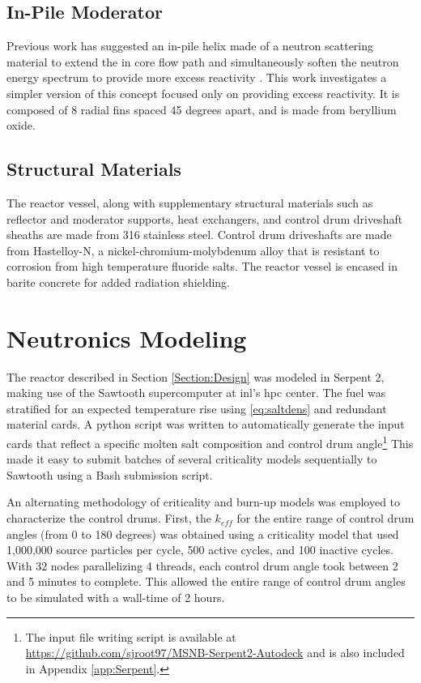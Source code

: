 \subsection{In-Pile Moderator}
Previous work has suggested an in-pile helix made of a neutron scattering material to extend the in core flow path and simultaneously soften the neutron energy spectrum to provide more excess reactivity \cite{CarterPHD}. This work investigates a simpler version of this concept focused only on providing excess reactivity. It is composed of 8 radial fins spaced 45 degrees apart, and is made from beryllium oxide.

\subsection{Structural Materials}
The reactor vessel, along with supplementary structural materials such as reflector and moderator supports, heat exchangers, and control drum driveshaft sheaths are made from 316 stainless steel. Control drum driveshafts are made from Hastelloy-N, a nickel-chromium-molybdenum alloy that is resistant to corrosion from high temperature fluoride salts. The reactor vessel is encased in barite concrete for added radiation shielding.

\section{Neutronics Modeling}\label{Section:Serpent}
The reactor described in Section \ref{Section:Design} was modeled in Serpent 2, making use of the Sawtooth supercomputer at \acs{inl}'s \acs{hpc} center. The fuel was stratified for an expected temperature rise using \ref{eq:saltdens} and redundant material cards. A python script was written to automatically generate the input cards that reflect a specific molten salt composition and control drum angle\footnote{The input file writing script is available at \href{https://github.com/sjroot97/MSNB-Serpent2-Autodeck}{https://github.com/sjroot97/MSNB-Serpent2-Autodeck} and is also included in Appendix \ref{app:Serpent}.} This made it easy to submit batches of several criticality models sequentially to Sawtooth using a Bash submission script.

 An alternating methodology of criticality and burn-up models was employed to characterize the control drums. First, the $k_{eff}$ for the entire range of control drum angles (from 0 to 180 degrees) was obtained using a criticality model that used 1,000,000 source particles per cycle, 500 active cycles, and 100 inactive cycles. With 32 nodes parallelizing 4 threads, each control drum angle took between 2 and 5 minutes to complete. This allowed the entire range of control drum angles to be simulated with a wall-time of 2 hours.  

